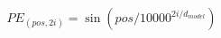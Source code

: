 \begin{equation}
    \label{sinPE}
    PE_{(pos,2i)} = \sin (pos / 10000^{2i/d_{model}})
\end{equation}
